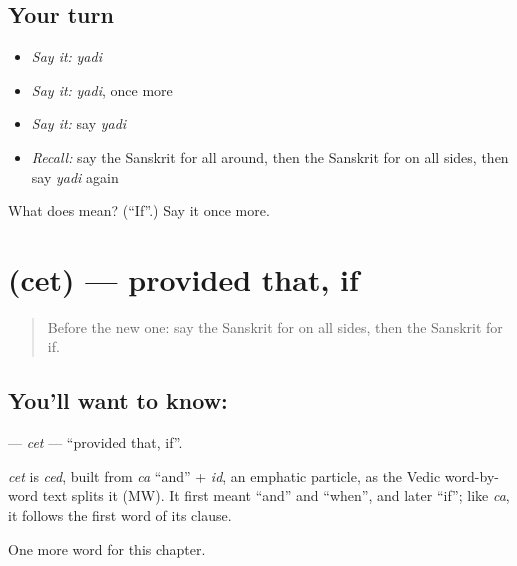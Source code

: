 \subsection*{Your turn}
\begin{itemize}
\raggedright
  \item \emph{Say it:} \emph{yadi}
  \item \emph{Say it:} \emph{yadi}, once more
  \item \emph{Say it:} say \emph{yadi}
  \item \emph{Recall:} say the Sanskrit for all around, then the Sanskrit for on all sides, then say \emph{yadi} again
\end{itemize}

\begin{tcolorbox}[breakable,colback=teal!4,colframe=teal!35!black,title={Before you move on}]
What does  mean? (\textquotedblleft{}If\textquotedblright{}.) Say it once more.
\end{tcolorbox}
\section[\texorpdfstring{\sk{चेत्} (cet)}{चेत् (cet)}]{ (cet) — provided that, if}

\label{lesson:SA-C154-cet}



\begin{quote}
Before the new one: say the Sanskrit for on all sides, then the Sanskrit for if.
\end{quote}

\subsection*{You'll want to know: }
\textbf{} — \emph{cet} — \textquotedblleft{}provided that, if\textquotedblright{}.

\begin{cousinweb}
\emph{cet} is \emph{ced}, built from \emph{ca} \textquotedblleft{}and\textquotedblright{} + \emph{id}, an emphatic particle, as the Vedic word-by-word text splits it (MW). It first meant \textquotedblleft{}and\textquotedblright{} and \textquotedblleft{}when\textquotedblright{}, and later \textquotedblleft{}if\textquotedblright{}; like \emph{ca}, it follows the first word of its clause.
\end{cousinweb}

\begin{grammarlens}[title={What you've built}]
One more word for this chapter.
\end{grammarlens}

